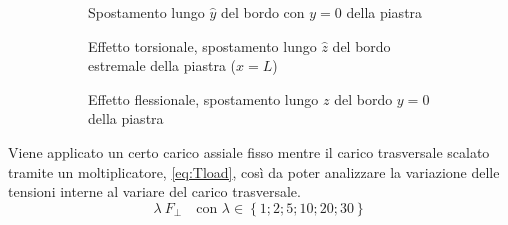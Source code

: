 \documentclass[a4paper,num-refs]{oup-contemporary}
\begin{document}
\begin{figure}[bt!]
	\centering
	
	\begin{subfigure}[t]{0.3\textwidth}
		\centering
		\caption{Spostamento lungo $\hat y$ del bordo con $y=0$ della piastra}
		
	\end{subfigure}
	\hfill
	\begin{subfigure}[t]{0.3\textwidth}
		\centering
		
		\caption{Effetto torsionale, spostamento lungo $\hat z$ del bordo estremale della piastra ($x=L$)}
		
	\end{subfigure}
	\hfill
	\begin{subfigure}[t]{0.3\textwidth}
		\centering
		\caption{Effetto flessionale, spostamento lungo $z$ del bordo $y=0$ della piastra}
	\end{subfigure}
	\hfill
	\caption{}
	\label{fig:last_layer}
	
	\centering
	
	\begin{subfigure}[t]{0.3\textwidth}
		\centering
		\caption {}
		
	\end{subfigure}
	\hfill
	\begin{subfigure}[t]{0.3\textwidth}
		\centering
		
		\caption{}
		
	\end{subfigure}
	\hfill
	\begin{subfigure}[t]{0.3\textwidth}
		\centering
		\caption{}
			\label{fig:stress}
	\end{subfigure}
	\hfill
	\caption{}

\end{figure}

Viene applicato un certo carico assiale fisso mentre il carico trasversale scalato tramite un moltiplicatore, \cref{eq:Tload}, così da poter analizzare la variazione delle tensioni interne al variare del carico trasversale. 
\begin{equation}
	\lambda \:F_{\perp} \quad \text{con } \lambda \in \left\{1; 2; 5;10;20;30\right\}
	\label{eq:Tload}
\end{equation}
\end{document}
